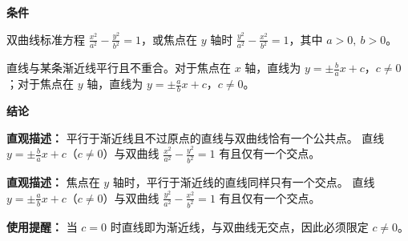 \begin{statementbox}
	\textbf{\textcolor{CStatement}{条件}}
	\begin{description}[style=nextline, leftmargin=2.8em, labelsep=0.5em, itemsep=0.35em]
		\item[\textbf{\textcolor{CStatement}{条件1（曲线方程）：}}]
			双曲线标准方程 $\frac{x^2}{a^2} - \frac{y^2}{b^2} = 1$，或焦点在 $y$ 轴时 $\frac{y^2}{a^2} - \frac{x^2}{b^2} = 1$，其中 $a>0,\ b>0$。
		\item[\textbf{\textcolor{CStatement}{条件2（直线形态）：}}]
			直线与某条渐近线平行且不重合。对于焦点在 $x$ 轴，直线为 $y = \pm\frac{b}{a}x + c$，$c\neq0$；对于焦点在 $y$ 轴，直线为 $y = \pm\frac{a}{b}x + c$，$c\neq0$。
	\end{description}
	\textbf{\textcolor{CStatement}{结论}}
	\begin{description}[style=nextline, leftmargin=2.8em, labelsep=0.5em, itemsep=0.45em]
		\item[\textbf{\textcolor{CStatement}{结论一（单交点性）：}}]
			\textbf{\textcolor{CStatement}{直观描述：}}
			平行于渐近线且不过原点的直线与双曲线恰有一个公共点。 直线 $y = \pm\frac{b}{a}x + c$（$c\neq0$）与双曲线 $\frac{x^2}{a^2}-\frac{y^2}{b^2}=1$ 有且仅有一个交点。
		\item[\textbf{\textcolor{CStatement}{推广结论（$y$轴形式）：}}]
			\textbf{\textcolor{CStatement}{直观描述：}}
			焦点在 $y$ 轴时，平行于渐近线的直线同样只有一个交点。 直线 $y = \pm\frac{a}{b}x + c$（$c\neq0$）与双曲线 $\frac{y^2}{a^2}-\frac{x^2}{b^2}=1$ 有且仅有一个交点。
	\end{description}
	\textbf{\textcolor{CStatement}{使用提醒：}}
	当 $c=0$ 时直线即为渐近线，与双曲线无交点，因此必须限定 $c\neq0$。
\end{statementbox}
